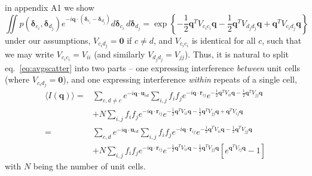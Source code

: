 \documentclass{article}
\begin{document}
in appendix A1 we show 
\begin{equation}
\iint p( \boldsymbol{\delta}_{c_i},  \boldsymbol{\delta}_{d_j} )
e^{-i \mathbf{q} \cdot ( \boldsymbol{\delta}_{c_i}  - \boldsymbol{\delta}_{d_j})} 
d \boldsymbol{\delta}_{c_i}  \, d \boldsymbol{\delta}_{d_j}
=
\exp \left\{
- \frac{1}{2} \mathbf{q}^T V_{c_i c_i} \mathbf{q}
- \frac{1}{2} \mathbf{q}^T V_{d_j d_j} \mathbf{q}
+ \mathbf{q}^T V_{c_i d_j} \mathbf{q}
\right\}
\label{eq:disorder_term}
\end{equation}
under our assumptions, $V_{c_i d_j} = \mathbf{0}$ if $c \neq d$, and $V_{c_i c_i}$ is identical for all $c$, such that we may write $V_{c_i c_i} = V_{ii}$ (and similarly $V_{d_j d_j} = V_{jj}$). Thus, it is natural to split eq.~\ref{eq:avgscatter} into two parts -- one expressing interference \textit{between} unit cells (where $V_{c_i d_j} = \mathbf{0}$), and one expressing interference \textit{within} repeats of a single cell,
\begin{align}
\langle I (\mathbf{q}) \rangle =&
%
\sum\limits_{c,d \neq c} e^{-i \mathbf{q} \cdot \mathbf{u}_{c d}} 
\sum\limits_{i,j} f_i f_j e^{-i \mathbf{q} \cdot \mathbf{r}_{ij}} 
%
e^{
- \frac{1}{2} \mathbf{q}^T V_{ii} \mathbf{q}
- \frac{1}{2} \mathbf{q}^T V_{jj} \mathbf{q}
} \\
%
&+
N \sum\limits_{i,j} f_i f_j e^{-i \mathbf{q} \cdot \mathbf{r}_{ij}} 
%
e^{
- \frac{1}{2} \mathbf{q}^T V_{ii} \mathbf{q}
- \frac{1}{2} \mathbf{q}^T V_{jj} \mathbf{q}
+ \mathbf{q}^T V_{ij} \mathbf{q}
}  \\
%
=&
%
\sum\limits_{c, d} e^{-i \mathbf{q} \cdot \mathbf{u}_{c d}} 
\sum\limits_{i,j} f_i f_j e^{-i \mathbf{q} \cdot \mathbf{r}_{ij}} 
%
e^{
- \frac{1}{2} \mathbf{q}^T V_{ii} \mathbf{q}
- \frac{1}{2} \mathbf{q}^T V_{jj} \mathbf{q}
} \\
%
&+
N \sum\limits_{i,j} f_i f_j e^{-i \mathbf{q} \cdot \mathbf{r}_{ij}} 
%
e^{
- \frac{1}{2} \mathbf{q}^T V_{ii} \mathbf{q}
- \frac{1}{2} \mathbf{q}^T V_{jj} \mathbf{q}
}
%
\left[ 
e^{\mathbf{q}^T V_{ij} \mathbf{q}} - 1
\right]
%
\end{align}
with $N$ being the number of unit cells.
\end{document}
